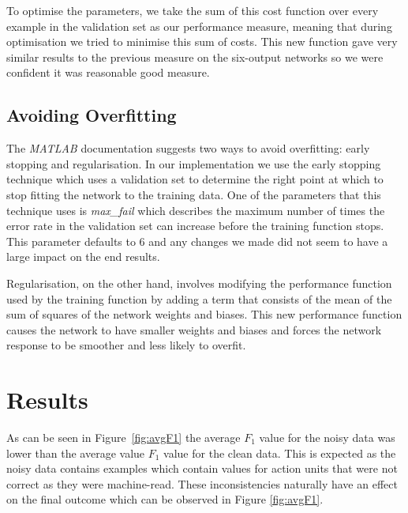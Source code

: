 \documentclass[10pt,a4paper]{article}
\begin{document}
To optimise the parameters, we take the sum of this cost function over every example in the validation set as our performance measure, meaning that during optimisation we tried to minimise this sum of costs. This new function gave very similar results to the previous measure on the six-output networks so we were confident it was reasonable good measure.

\subsection{Avoiding Overfitting}
The \emph{MATLAB} documentation suggests two ways to avoid overfitting: early stopping and regularisation. In our implementation we use the early stopping technique which uses a validation set to determine the right point at which to stop fitting the network to the training data. One of the parameters that this technique uses is \emph{max\_fail} which describes the maximum number of times the error rate in the validation set can increase before the training function stops. This parameter defaults to 6 and any changes we made did not seem to have a large impact on the end results.

Regularisation, on the other hand, involves modifying the performance function used by the training function by adding a term that consists of the mean of the sum of squares of the network weights and biases. This new performance function causes the network to have smaller weights and biases and forces the network response to be smoother and less likely to overfit.

\section{Results}

As can be seen in Figure~\ref{fig:avgF1} the average $F_1$ value for the noisy data was lower than the average value $F_1$ value for the clean data. This is expected as the noisy data contains examples which contain values for action units that were not correct as they were machine-read. These inconsistencies naturally have an effect on the final outcome which can be observed in Figure \ref{fig:avgF1}.
\end{document}
